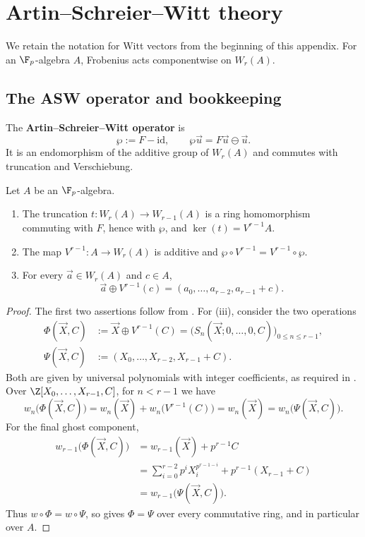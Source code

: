\section{Artin--Schreier--Witt theory}
\label{appendix:asw_development}

We retain the notation for Witt vectors from the beginning of this appendix.
For an $\F_p$-algebra $A$, Frobenius acts componentwise on $W_r(A)$.

\subsection{The ASW operator and bookkeeping}

\begin{definition}\label{definition:asw_operator}
The \textbf{Artin--Schreier--Witt operator} is
\[
\wp:=F-\mathrm{id},\qquad
\wp\vec u=F\vec u\ominus\vec u.
\]
It is an endomorphism of the additive group of $W_r(A)$ and commutes with
truncation and Verschiebung.
\end{definition}

\begin{lemma}\label{lemma:witt_bookkeeping}
Let $A$ be an $\F_p$-algebra.
\begin{enumerate}[label=(\roman*)]
    \item The truncation $t:W_r(A)\to W_{r-1}(A)$ is a ring homomorphism
    commuting with $F$, hence with $\wp$, and
    $\ker(t)=V^{r-1}A$.
    \item The map $V^{r-1}:A\to W_r(A)$ is additive and
    $\wp\circ V^{r-1}=V^{r-1}\circ\wp$.
    \item For every $\vec a\in W_r(A)$ and $c\in A$,
    \[
    \vec a\oplus V^{r-1}(c)
    =(a_0,\dots,a_{r-2},a_{r-1}+c).
    \]
\end{enumerate}
\end{lemma}

\begin{proof}
The first two assertions follow from
. For (iii), consider the two operations
\[
\begin{aligned}
 \Phi(\vec X,C)
 &:=\vec X\oplus V^{r-1}(C)
   =\bigl(S_n(\vec X;0,\dots,0,C)\bigr)_{0\leq n\leq r-1},\\
 \Psi(\vec X,C)
 &:=(X_0,\dots,X_{r-2},X_{r-1}+C).
\end{aligned}
\]
Both are given by universal polynomials with integer coefficients, as required
in . Over
$\Z[X_0,\dots,X_{r-1},C]$, for $n<r-1$ we have
\[
 w_n\bigl(\Phi(\vec X,C)\bigr)
 =w_n(\vec X)+w_n\bigl(V^{r-1}(C)\bigr)
 =w_n(\vec X)
 =w_n\bigl(\Psi(\vec X,C)\bigr).
\]
For the final ghost component,
\[
\begin{aligned}
 w_{r-1}\bigl(\Phi(\vec X,C)\bigr)
 &=w_{r-1}(\vec X)+p^{r-1}C\\
 &=\sum_{i=0}^{r-2}p^iX_i^{p^{r-1-i}}
   +p^{r-1}(X_{r-1}+C)\\
 &=w_{r-1}\bigl(\Psi(\vec X,C)\bigr).
\end{aligned}
\]
Thus $w\circ\Phi=w\circ\Psi$, so
 gives $\Phi=\Psi$ over every commutative ring,
and in particular over $A$.
\end{proof}

